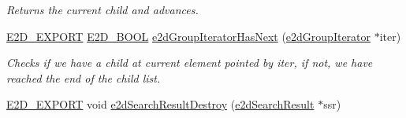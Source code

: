\begin{DoxyCompactItemize}
\begin{DoxyCompactList}\small\item\em Returns the current child and advances. \end{DoxyCompactList}\item 
\hyperlink{Ez2DS_8h_a9f14e9cb869e1a85fdaba03afcca0df9}{E2\-D\-\_\-\-E\-X\-P\-O\-R\-T} \hyperlink{Ez2DS_8h_aac8cdc3a3bcd6b56a8c3e0bb6979cbf8}{E2\-D\-\_\-\-B\-O\-O\-L} \hyperlink{group__e2dGroup_ga2e74310ea432fa45cea8b03da8fc29ef}{e2d\-Group\-Iterator\-Has\-Next} (\hyperlink{structe2dGroupIterator}{e2d\-Group\-Iterator} $\ast$iter)
\begin{DoxyCompactList}\small\item\em Checks if we have a child at current element pointed by iter, if not, we have reached the end of the child list. \end{DoxyCompactList}\item 
\hypertarget{group__e2dGroup_ga0775c9a7e2ec5311263f84339afb52bc}{\hyperlink{Ez2DS_8h_a9f14e9cb869e1a85fdaba03afcca0df9}{E2\-D\-\_\-\-E\-X\-P\-O\-R\-T} void \hyperlink{group__e2dGroup_ga0775c9a7e2ec5311263f84339afb52bc}{e2d\-Search\-Result\-Destroy} (\hyperlink{structe2dSearchResult}{e2d\-Search\-Result} $\ast$ssr)}\label{group__e2dGroup_ga0775c9a7e2ec5311263f84339afb52bc}


\end{DoxyCompactItemize}
